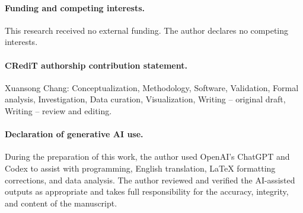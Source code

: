 \documentclass[11pt]{article}
\begin{document}
\paragraph{Funding and competing interests.}
This research received no external funding. The author declares no competing
interests.

\paragraph{CRediT authorship contribution statement.}
Xuansong Chang: Conceptualization, Methodology, Software, Validation, Formal
analysis, Investigation, Data curation, Visualization, Writing -- original draft,
Writing -- review and editing.

\paragraph{Declaration of generative AI use.}
During the preparation of this work, the author used OpenAI's ChatGPT and Codex
to assist with programming, English translation, LaTeX formatting corrections,
and data analysis. The author reviewed and verified the AI-assisted outputs as
appropriate and takes full responsibility for the accuracy, integrity, and
content of the manuscript.



\end{document}
